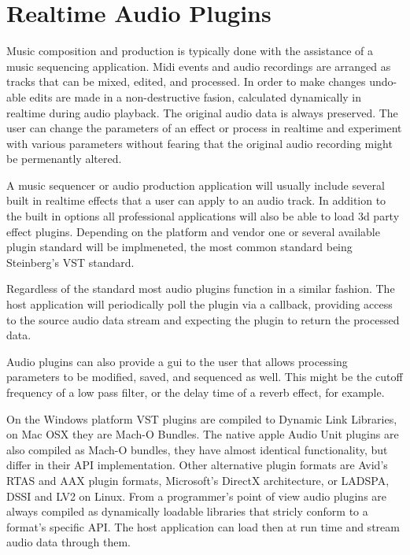 \section{Realtime Audio Plugins}

Music composition and production is typically done with the assistance of a music sequencing application. Midi events and audio recordings are arranged as tracks that can be mixed, edited, and processed. In order to make changes undo-able edits are made in a non-destructive fasion, calculated dynamically in realtime during audio playback. The original audio data is always preserved. The user can change the parameters of an effect or process in realtime and experiment with various parameters without fearing that the original audio recording might be permenantly altered.

A music sequencer or audio production application will usually include several built in realtime effects that a user can apply to an audio track. In addition to the built in options all professional applications will also be able to load 3d party effect plugins. Depending on the platform and vendor one or several available plugin standard will be implmeneted, the most common standard being Steinberg's VST standard.

Regardless of the standard most audio plugins function in a similar fashion. The host application will periodically poll the plugin via a callback, providing access to the source audio data stream and expecting the plugin to return the processed data.

Audio plugins can also provide a gui to the user that allows processing parameters to be modified, saved, and sequenced as well. This might be the cutoff frequency of a low pass filter, or the delay time of a reverb effect, for example.

On the Windows platform VST plugins are compiled to Dynamic Link Libraries, on Mac OSX they are Mach-O Bundles. The native apple Audio Unit plugins are also compiled as Mach-O bundles, they have almost identical functionality, but differ in their API implementation. Other alternative plugin formats are Avid's RTAS and AAX plugin formats, Microsoft's DirectX architecture, or LADSPA, DSSI and LV2 on Linux. From a programmer's point of view audio plugins are always compiled as dynamically loadable libraries that stricly conform to a format's specific API. The host application can load then at run time and stream audio data through them.

